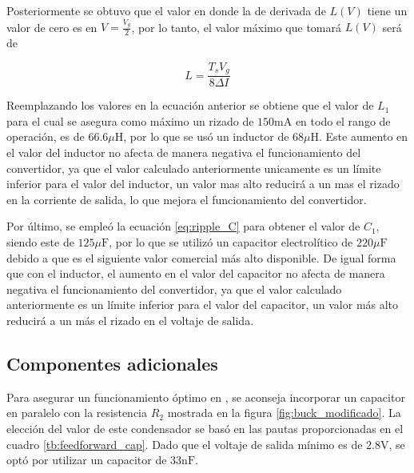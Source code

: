         Posteriormente se obtuvo que el valor en
        donde la de derivada de $L(V)$ tiene un valor de cero es en $V = \frac{V_g}{2}$,
        por lo tanto, el valor máximo que tomará $L(V)$ será de 

        $$ L =  \frac{T_sV_g}{8\Delta I}$$
        
        Reemplazando los valores en la ecuación anterior se obtiene que el valor de 
        $L_1$ para el cual se asegura como máximo un rizado de $150 \text{mA}$ en 
        todo el rango de operación, es de $66.6 \mu \text{H}$, por lo que se usó un
        inductor de $68 \mu \text{H}$. Este aumento en el valor del inductor no afecta
        de manera negativa el funcionamiento del convertidor, ya que el valor calculado
        anteriormente unicamente es un límite inferior para el valor del inductor, un 
        valor mas alto reducirá a un mas el rizado en la corriente de salida, lo que 
        mejora el funcionamiento del convertidor.

        Por último, se empleó la ecuación \ref{eq:ripple_C} para obtener el valor 
        de $C_1$, siendo este de $125 \mu\text{F}$, por lo que se utilizó un capacitor
        electrolítico de $220 \mu\text{F}$ debido a que es el siguiente valor comercial 
        más alto disponible. De igual forma que con el inductor, el
        aumento en el valor del capacitor no afecta de manera negativa el funcionamiento
        del convertidor, ya que el valor calculado anteriormente es un límite inferior
        para el valor del capacitor, un valor más alto reducirá a un más el rizado en
        el voltaje de salida.

    \subsection{Componentes adicionales}

        Para asegurar un funcionamiento óptimo en \cite{lm2596}, se aconseja incorporar
        un capacitor en paralelo con la resistencia $R_2$ mostrada en la figura
        \ref{fig:buck_modificado}. La elección del valor de este condensador se basó
        en las pautas proporcionadas en el cuadro \ref{tb:feedforward_cap}. 
        Dado que el voltaje de salida mínimo es de $2.8\text{V}$, se optó por utilizar
        un capacitor de $33\text{nF}$.

